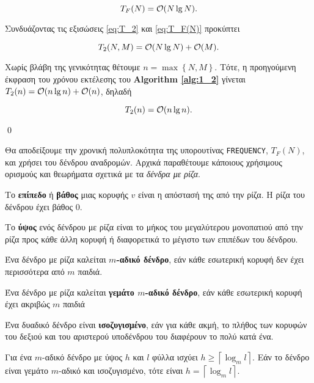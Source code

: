 	\begin{equation}
		\label{eq:T_F(N)}
		T_{F}(N)=\mathcal{O}(N\lg{N}).
	\end{equation}

	Συνδυάζοντας τις εξισώσεις \eqref{eq:T_2} και \eqref{eq:T_F(N)} προκύπτει

	\begin{equation*}
		T_{2}(N,M)=\mathcal{O}(N\lg{N})+\mathcal{O}(M).
	\end{equation*}

	Χωρίς βλάβη της γενικότητας θέτουμε $n=\max\left\{N,M\right\}$. Τότε, η προηγούμενη έκφραση του χρόνου εκτέλεσης του \textbf{Algorithm \ref{alg:1_2}} γίνεται $T_{2}(n)=\mathcal{O}(n\lg{n})+\mathcal{O}(n)$, δηλαδή

	\begin{equation}
		\label{eq:alg_1.2a_O(nlgn)}
		T_{2}(n)=\mathcal{O}(n\lg{n}).
	\end{equation}

	\qed

	\vspace*{20pt}
	Θα αποδείξουμε την χρονική πολυπλοκότητα της υπορουτίνας \texttt{FREQUENCY}, $T_{F}(N)$, και χρήσει του δένδρου αναδρομών. Αρχικά παραθέτουμε κάποιους χρήσιμους ορισμούς και θεωρήματα σχετικά με τα \textsl{δένδρα με ρίζα}.

	\begin{definition}
		Το \textbf{επίπεδο} ή \textbf{βάθος} μιας κορυφής $v$ είναι η απόστασή της από την ρίζα. Η ρίζα του δένδρου έχει βάθος $0$. 
	\end{definition}
	\begin{definition}[Ύψος]
		Το \textbf{ύψος} ενός δένδρου με ρίζα είναι το μήκος του μεγαλύτερου μονοπατιού από την ρίζα προς κάθε άλλη κορυφή ή διαφορετικά το μέγιστο των επιπέδων του δένδρου. 
	\end{definition}
	\begin{definition}
		Ένα δένδρο με ρίζα καλείται \textbf{$m$-αδικό δένδρο}, εάν κάθε εσωτερική κορυφή δεν έχει περισσότερα από $m$ παιδιά. 
	\end{definition}
	\begin{definition}
		Ένα δένδρο με ρίζα καλείται \textbf{γεμάτο $m$-αδικό δένδρο}, εάν κάθε εσωτερική κορυφή  έχει ακριβώς $m$ παιδιά 
	\end{definition}
	\begin{definition}
		Ένα δυαδικό δένδρο είναι \textbf{ισοζυγισμένο}, εάν για κάθε ακμή, το πλήθος των κορυφών του δεξιού και του αριστερού υποδένδρου του διαφέρουν το πολύ κατά ένα. 
	\end{definition}
	\begin{theorem}
		\label{thrm:tree_h}
		Για ένα $m$-αδικό δένδρο με ύψος $h$ και $l$ φύλλα ισχύει $h\geqslant\left\lceil\log_m{l}\right\rceil$. Εάν το δένδρο είναι γεμάτο $m$-αδικό και ισοζυγισμένο, τότε είναι  $h=\left\lceil\log_m{l}\right\rceil$. 
	\end{theorem}

